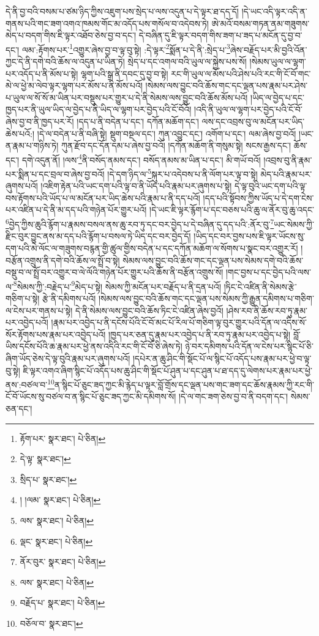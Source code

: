 དེ་ནི་བྱ་བའི་བསམ་པ་ཙམ་ཉིད་ཀྱིས་འཇུག་པས་སྲེད་པ་ལས་འདུན་པ་དེ་ལྟར་ཐ་དད་དོ། །དེ་ཡང་འདི་ལྟར་འདི་ན་གནས་པའི་གང་ཟག་འགའ་ཁམས་གོང་མ་འདོད་པས་གསོལ་བ་འདེབས་ཏེ། ཨེ་མའོ་བསམ་གཏན་ནམ་གཟུགས་མེད་པ་བདག་གིས་ཇི་ལྟར་འཐོབ་ཅེས་བྱ་བ་དང་། དེ་བཞིན་དུ་ཇི་ལྟར་བདག་གིས་ཟག་པ་ཟད་པ་མངོན་དུ་བྱ་བ་དང་། ལམ་:རྟོགས་པར་\footnote{རྟོག་པར་  སྣར་ཐང་།  པེ་ཅིན། }འགྱུར་ཞེས་བྱ་བ་ལྟ་བུ་སྟེ། :དེ་ལྟར་\footnote{དེ་ལྟ་  སྣར་ཐང་། }སྨོན་པ་དེ་ནི་:སྲེད་པ་\footnote{སྲིད་པ་  སྣར་ཐང་། }ཞེས་བརྗོད་པར་མི་བྱའི་འོན་ཀྱང་དེ་ནི་དགེ་བའི་ཆོས་ལ་འདུན་པ་ཡིན་ཏེ། སྲེད་པ་དང་འགལ་བའི་ཡུལ་ལ་སྐྱེས་པས་སོ། །སེམས་ཡུལ་ལ་ལྷག་པར་འདོད་པ་ནི་མོས་པ་སྟེ། ལྷག་པའི་སྒྲ་ནི་དབང་དུ་བྱ་བ་སྟེ། རང་གི་ཡུལ་ལ་མོས་པའི་ཤེས་པའི་རང་གི་ངོ་བོ་གང་མེ་ལ་ཕྱེ་མ་ལེབ་ལྟར་ལྷག་པར་མོས་པ་ནི་མོས་པའོ། །སེམས་ལས་བྱུང་བའི་ཆོས་གང་དང་ལྡན་པས་རྣམ་པར་ཤེས་པ་ཡུལ་ལ་སོ་སོ་མ་ཡིན་པར་བསྡུས་པར་གྱུར་པ་དེ་ནི་སེམས་ལས་བྱུང་བའི་ཆོས་མོས་པའོ། །ཡིད་ལ་བྱེད་པ་དང་ཁྱད་པར་ནི་ཡུལ་ཡིད་ལ་བྱེད་པ་ནི་ཡིད་ལ་ལྷག་པར་བྱེད་པའི་ངོ་བོའོ། །འདི་ནི་ཡུལ་ལ་ལྷག་པར་བྱེད་པའི་ངོ་བོ་ཞེས་བྱ་བ་ནི་ཁྱད་པར་རོ། །དད་པ་ནི་བདེན་པ་དང་། དཀོན་མཆོག་དང་། ལས་དང་འབྲས་བུ་ལ་མངོན་པར་ཡིད་ཆེས་པའོ:། །དེ་ལ་བདེན་པ་ནི་བཞི་སྟེ། སྡུག་བསྔལ་དང་། ཀུན་འབྱུང་དང་། འགོག་པ་དང་། ལམ་ཞེས་བྱ་བའོ། །ཡང་ན་རྣམ་པ་གཉིས་ཏེ། ཀུན་རྫོབ་དང་དོན་དམ་པ་ཞེས་བྱ་བའོ། །དཀོན་མཆོག་ནི་གསུམ་སྟེ། སངས་རྒྱས་དང་། ཆོས་དང་། དགེ་འདུན་ནོ། །ལས་\footnote{། །ལམ་  སྣར་ཐང་།  པེ་ཅིན། }ནི་བསོད་ནམས་དང་། བསོད་ནམས་མ་ཡིན་པ་དང་། མི་གཡོ་བའོ། །འབྲས་བུ་ནི་རྣམ་པར་སྨིན་པ་དང་བྲལ་བ་ཞེས་བྱ་བའོ། །དེ་དག་ཉིད་ལ་\footnote{ལས་  སྣར་ཐང་།  པེ་ཅིན། }སྐུར་པ་འདེབས་པ་ནི་ལོག་པར་ལྟ་བ་སྟེ། མེད་པའི་རྣམ་པར་ཞུགས་པའོ། །འཇིག་རྟེན་པའི་ཡང་དག་པའི་ལྟ་བ་ནི་ཡོད་པའི་རྣམ་པར་ཞུགས་པ་སྟེ། དེ་ལྟ་བུའི་ཡང་དག་པའི་ལྟ་བས་རྟོགས་པའི་ཡོད་པ་ལ་མངོན་པར་ཡིད་ཆེས་པའི་རྣམ་པ་ནི་དད་པའོ། །དད་པའི་སྟོབས་ཀྱིས་ཡོད་པ་དེ་དག་ངེས་པར་འཛིན་པ་དེ་ནི་མ་དད་པའི་གཉེན་པོར་གྱུར་པའོ། །དེ་ཡང་ཇི་ལྟར་རྙོག་པ་དང་བཅས་པའི་ཆུ་ལ་ནོར་བུ་ཆུ་འདང་\footnote{ལྡང་  སྣར་ཐང་།  པེ་ཅིན། }བྱེད་ཀྱིས་ཆུའི་རྙོག་པ་རྣམས་བསལ་ནས་ཆུ་རབ་ཏུ་དང་བར་བྱེད་པ་དེ་བཞིན་དུ་དད་པའི་:ནོར་བུ་\footnote{ནོར་བུར་  སྣར་ཐང་།  པེ་ཅིན། }ཡང་སེམས་ཀྱི་རྫིང་བུར་བྱུང་ནས་མ་དད་པའི་རྙོག་པ་བསལ་ཏེ་ཡིད་དང་བར་བྱེད་དོ། །ཡིད་དང་བར་བྱས་པས་ཇི་ལྟར་ཡོངས་སུ་དག་པའི་མེ་ལོང་ལ་གཟུགས་བརྙན་གྱི་ཚུལ་གྱིས་བདེན་པ་དང་དཀོན་མཆོག་ལ་སོགས་པ་སྣང་བར་འགྱུར་རོ། །བརྩོན་འགྲུས་ནི་དགེ་བའི་ཆོས་ལ་སྤྲོ་བ་སྟེ། སེམས་ལས་བྱུང་བའི་ཆོས་གང་དང་ལྡན་པས་སེམས་དགེ་བའི་ཆོས་བསྡུ་བ་ལ་སྤྲོ་བར་འགྱུར་བ་ལེ་ལོའི་གཉེན་པོར་གྱུར་པའི་ཆོས་ནི་བརྩོན་འགྲུས་སོ། །གང་བྱས་པ་དང་བྱེད་པའི་ལས་ལ་\footnote{ལས་  སྣར་ཐང་།  པེ་ཅིན། }སེམས་ཀྱི་:བརྗེད་པ་\footnote{བརྗོད་པ་  སྣར་ཐང་།  པེ་ཅིན། }མེད་པ་སྟེ། སེམས་ཀྱི་མངོན་པར་བརྗོད་པ་ནི་དྲན་པའོ། །ཏིང་ངེ་འཛིན་ནི་སེམས་རྩེ་གཅིག་པ་སྟེ། རྩེ་ནི་དམིགས་པའོ། །སེམས་ལས་བྱུང་བའི་ཆོས་གང་དང་ལྡན་པས་སེམས་ཀྱི་རྒྱུན་དམིགས་པ་གཅིག་ལ་ངེས་པར་གནས་པ་སྟེ། དེ་ནི་སེམས་ལས་བྱུང་བའི་ཆོས་ཏིང་ངེ་འཛིན་ཞེས་བྱའོ། །ཤེས་རབ་ནི་ཆོས་རབ་ཏུ་རྣམ་པར་འབྱེད་པའོ། །རྣམ་པར་འབྱེད་པ་ནི་དངོས་པོའི་ངོ་བོ་མང་པོ་རིལ་པོ་གཅིག་ལྟ་བུར་གྱུར་པའི་དོན་ལ་འདིས་སོ་སོར་རྟོགས་པས་རྣམ་པར་འབྱེད་པའོ། །ཁྱད་པར་ཅན་དུ་རྣམ་པར་འབྱེད་པ་ནི་རབ་ཏུ་རྣམ་པར་འབྱེད་པ་སྟེ། བློ་ཡིས་དངོས་པོའི་ཆ་རྣམ་པར་ཕྱེ་ནས་འདིའི་རང་གི་ངོ་བོ་ཅི་ཞེས་ཏེ། ཉེ་བར་དམིགས་པའི་དོན་ལ་ངེས་པར་སྙིང་པོ་ཅི་ཞིག་ཡོད་ཅེས་དེ་ལྟ་བུའི་རྣམ་པར་ཞུགས་པའོ། །དཔེར་ན་ཆུ་ཤིང་གི་སྡོང་པོ་ལ་སྙིང་པོ་འདོད་པས་རྣམ་པར་ཕྱེ་བ་ལྟ་བུ་སྟེ། ཇི་ལྟར་འགའ་ཞིག་སྙིང་པོ་འདོད་པས་ཆུ་ཤིང་གི་སྡོང་པོ་ཤུན་པ་དང་ཤུན་པ་ཐ་དད་དུ་ལེགས་པར་རྣམ་པར་ཕྱེ་ནས་:བཙལ་བ་\footnote{བཅོལ་བ་  སྣར་ཐང་། }ན་སྙིང་པོ་ཅུང་ཟད་ཀྱང་མི་རྙེད་པ་ལྟར་བློ་གྲོས་དང་ལྡན་པས་གང་ཟག་དང་ཆོས་རྣམས་ཀྱི་རང་གི་ངོ་བོ་ཡོངས་སུ་བཙལ་བ་ན་སྙིང་པོ་ཅུང་ཟད་ཀྱང་མི་དམིགས་སོ། །དེ་ལ་གང་ཟག་ཅེས་བྱ་བ་ནི་བདག་དང་། སེམས་ཅན་དང་། 
